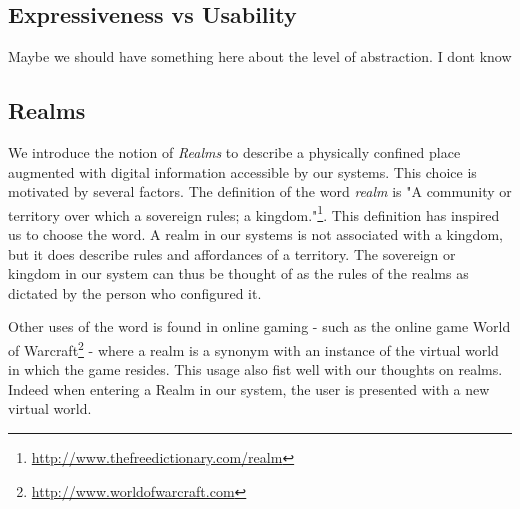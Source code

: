 \subsection{Expressiveness vs Usability} %
\label{sub:expressiveness_vs_usability}
Maybe we should have something here about the level of abstraction. I dont know 


\subsection{Realms} %
\label{sub:realms}
We introduce the notion of \emph{Realms} to describe a physically confined place augmented with digital information accessible by our systems. This choice is motivated by several factors. The definition of the word \emph{realm} is "A community or territory over which a sovereign rules; a kingdom."\footnote{\url{http://www.thefreedictionary.com/realm}}. This definition has inspired us to choose the word. A realm in our systems is not associated with a kingdom, but it does describe rules and affordances of a territory. The sovereign or kingdom in our system can thus be thought of as the rules of the realms as dictated by the person who configured it. 

Other uses of the word is found in online gaming - such as the online game World of Warcraft\footnote{\url{http://www.worldofwarcraft.com}} - where a realm is a synonym with an instance of the virtual world in which the game resides. This usage also fist well with our thoughts on realms. Indeed when entering a Realm in our system, the user is presented with a new virtual world.


